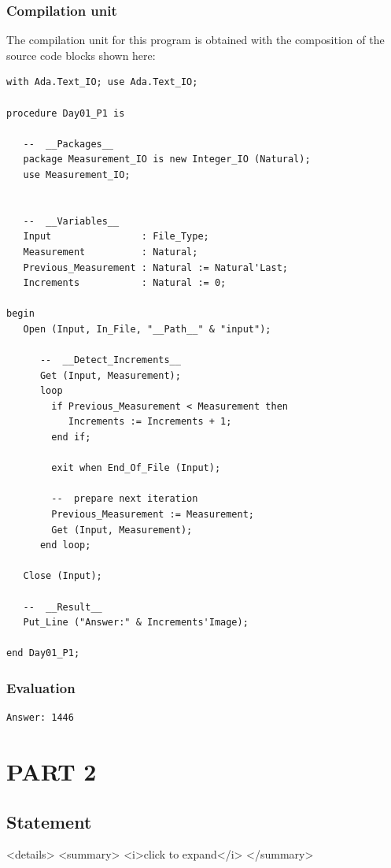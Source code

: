 \documentclass[11pt]{article}
\begin{document}
\subsubsection{Compilation unit}
\label{sec:org4726cd3}
The compilation unit for this program is obtained with the composition of the
source code blocks shown here:

\begin{verbatim}
with Ada.Text_IO; use Ada.Text_IO;

procedure Day01_P1 is

   --  __Packages__
   package Measurement_IO is new Integer_IO (Natural);
   use Measurement_IO;


   --  __Variables__
   Input                : File_Type;
   Measurement          : Natural;
   Previous_Measurement : Natural := Natural'Last;
   Increments           : Natural := 0;

begin
   Open (Input, In_File, "__Path__" & "input");

      --  __Detect_Increments__
      Get (Input, Measurement);
      loop
        if Previous_Measurement < Measurement then
           Increments := Increments + 1;
        end if;

        exit when End_Of_File (Input);

        --  prepare next iteration
        Previous_Measurement := Measurement;
        Get (Input, Measurement);
      end loop;

   Close (Input);

   --  __Result__
   Put_Line ("Answer:" & Increments'Image);

end Day01_P1;
\end{verbatim}

\subsubsection{Evaluation}
\label{sec:org8394bbd}

\begin{verbatim}
Answer: 1446
\end{verbatim}

\section{PART 2}
\label{sec:org94a7589}
\subsection{Statement}
\label{sec:orgc799151}
\begin{html}
<details>
<summary>
  <i>click to expand</i>
</summary>
\end{html}
\end{document}
